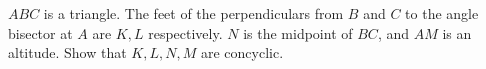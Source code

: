 $ABC$ is a triangle. The feet of the perpendiculars from $B$ and $C$ to the angle bisector at $A$ are $K, L$ respectively. $N$ is the midpoint of $BC$, and $AM$ is an altitude. Show that $K,L,N,M$ are concyclic.